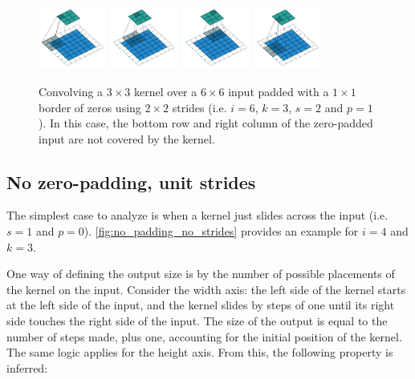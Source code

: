 \documentclass{article}
\begin{document}
\begin{figure}[t]
    \centering
    \includegraphics[width=0.2\textwidth]{pdf/padding_strides_odd_00.pdf}
    \includegraphics[width=0.2\textwidth]{pdf/padding_strides_odd_01.pdf}
    \includegraphics[width=0.2\textwidth]{pdf/padding_strides_odd_02.pdf}
    \includegraphics[width=0.2\textwidth]{pdf/padding_strides_odd_03.pdf}
    \caption{\label{fig:padding_strides_odd} Convolving a $3 \times 3$ kernel
        over a $6 \times 6$ input padded with a $1 \times 1$ border of zeros
        using $2 \times 2$ strides (i.e.  $i = 6$, $k = 3$, $s = 2$ and
        $p = 1$). In this case, the bottom row and right column of the
        zero-padded input are not covered by the kernel.}
\end{figure}

\subsection{No zero-padding, unit strides}

The simplest case to analyze is when a kernel just slides across the input (i.e.
$s = 1$ and $p = 0$). \autoref{fig:no_padding_no_strides} provides an example
for $i = 4$ and $k = 3$.

One way of defining the output size is by the number of possible placements of
the kernel on the input. Consider the width axis: the left side of the kernel
starts at the left side of the input, and the kernel slides by steps of one
until its right side touches the right side of the input. The size of the output
is equal to the number of steps made, plus one, accounting for the initial
position of the kernel. The same logic applies for the height axis. From this,
the following property is inferred:
\end{document}
